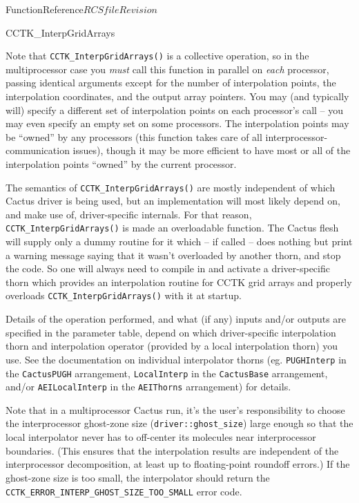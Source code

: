 \begin{cactuspart}{FunctionReference}{$RCSfile$}{$Revision$}
\begin{FunctionDescription}{CCTK\_InterpGridArrays}
\begin{Discussion}
Note that {\tt CCTK\_InterpGridArrays()} is a collective operation, so in the
multiprocessor case you {\em must\/} call this function in parallel on
{\em each\/} processor, passing identical arguments except for the number of
interpolation points, the interpolation coordinates, and the output array pointers.
You may (and typically will) specify a different set of
interpolation points on each processor's call -- you may even specify
an empty set on some processors.  The interpolation points may be
``owned'' by any processors (this function takes care of all
interprocessor-communication issues), though it may be more efficient
to have most or all of the interpolation points ``owned'' by the
current processor.

The semantics of {\tt CCTK\_InterpGridArrays()} are mostly independent of
which Cactus driver is being used, but an implementation will most likely depend
on, and make use of, driver-specific internals. For that reason,
{\tt CCTK\_InterpGridArrays()} is made an overloadable function. The Cactus
flesh will supply only a dummy routine for it which -- if called -- does nothing
but print a warning message saying that it wasn't overloaded by another thorn,
and stop the code. So one will always need to compile in and activate
a driver-specific thorn which provides an interpolation routine for CCTK grid
arrays and properly overloads {\tt CCTK\_InterpGridArrays()} with it at startup.

Details of the operation performed, and what (if any) inputs and/or
outputs are specified in the parameter table, depend on which driver-specific
interpolation thorn and interpolation operator (provided by a local
interpolation thorn) you use.  See the documentation on individual interpolator
thorns (eg. {\tt PUGHInterp} in the {\tt CactusPUGH} arrangement,
{\tt LocalInterp} in the {\tt CactusBase} arrangement, and/or
{\tt AEILocalInterp} in the {\tt AEIThorns} arrangement) for details.

Note that in a multiprocessor Cactus run, it's the user's responsibility
to choose the interprocessor ghost-zone size (\verb|driver::ghost_size|)
large enough so that the local interpolator never has to off-center
its molecules near interprocessor boundaries.  (This ensures that the
interpolation results are independent of the interprocessor decomposition,
at least up to floating-point roundoff errors.)
If the ghost-zone size is too small, the interpolator should return
the \verb|CCTK_ERROR_INTERP_GHOST_SIZE_TOO_SMALL| error code.
\end{Discussion}


\end{FunctionDescription}
\end{cactuspart}

